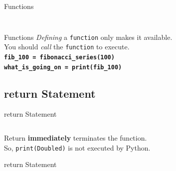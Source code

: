         \begin{frame}{Functions}
            \inputminted[frame=single,framesep=2pt]{python3}{code-examples/function_ex.py}
            \pause
            \inputminted[frame=single,framesep=2pt]{python3}{code-examples/function_ex2.py}
        \end{frame}

        \begin{frame}{Functions}
            \LARGE
            \textit{Defining} a \texttt{function} only makes it available.\\
            \pause 
            You should \textit{call} the \texttt{function} to execute.\\           
            \pause
            \newline
            \textbf{\texttt{fib\_100 = fibonacci\_series(100)}}\\
            \pause
            \textbf{\texttt{what\_is\_going\_on = print(fib\_100)}}\\
            \newline
        \end{frame}

      \subsection{return Statement}

        \begin{frame}{return Statement}
            \LARGE
            \pause
            \inputminted[frame=single,framesep=2pt]{python3}{code-examples/return.py}
            \pause
            Return \textbf{immediately} terminates the function.\\
            So, \texttt{print(\textquotesingle Doubled\textquotesingle)} is not executed by Python.
        \end{frame}

        \begin{frame}{return Statement}
            \LARGE
            \newline
            \newline
            \newline
        \end{frame}

